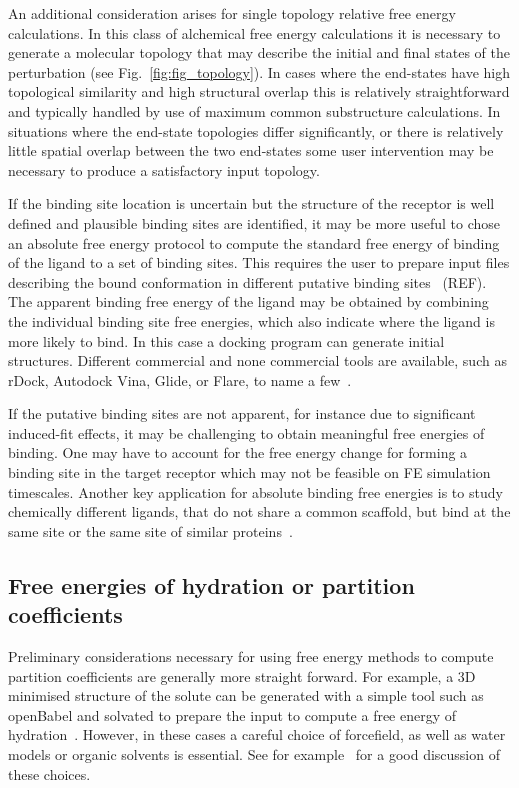 \documentclass[9pt,bestpractices]{livecoms}
\begin{document}
An additional consideration arises for single topology relative free energy calculations. In this class of alchemical free energy calculations it is necessary to generate a molecular topology that may describe the initial and final states of the perturbation (see Fig.~\ref{fig:fig_topology}). In cases where the end-states have high topological similarity and high structural overlap this is relatively straightforward and typically handled by use of maximum common substructure calculations. In situations where the end-state topologies differ significantly, or there is relatively little spatial overlap between the two end-states some user intervention may be necessary to produce a satisfactory input topology.

If the binding site location is uncertain but the structure of the receptor is well defined and plausible binding sites are identified, it may be more useful to chose an absolute free energy protocol to compute the standard free energy of binding of the ligand to a set of binding sites. This requires the user to prepare input files describing the bound conformation in different putative binding sites~\cite{10.1039/C6CP05680F} (REF). The apparent binding free energy of the ligand may be obtained by combining the individual binding site free energies, which also indicate where the ligand is more likely to bind. In this case a docking program can generate initial structures. Different commercial and none commercial tools are available, such as rDock, Autodock Vina, Glide, or Flare, to name a few~\cite{ruiz-carmona2014rdock, trott2010autodock, friesner2004glide, cheeseright2006molecular}. 

If the putative binding sites are not apparent, for instance due to significant induced-fit effects, it may be challenging to obtain meaningful free energies of binding. One may have to account for the free energy change for forming a binding site in the target receptor which may not be feasible on FE simulation timescales. Another key application for absolute binding free energies is to study chemically different ligands, that do not share a common scaffold, but bind at the same site or the same site of similar proteins~\cite{aldeghi2015accurate}.  

\subsection{Free energies of hydration or partition coefficients}
\label{subsec:hydration}
Preliminary considerations necessary for using free energy methods to compute partition coefficients are generally more straight forward. For example, a 3D minimised structure of the solute can be generated with a simple tool such as openBabel and solvated to prepare the input  to compute a free energy of hydration~\cite{oboyle2011open}. However, in these cases a careful choice of forcefield, as well as water models or organic solvents is essential. See for example~\cite{bosisio2016blinded,rustenburg2016measuring} for a good discussion of these choices. 
%
\end{document}
